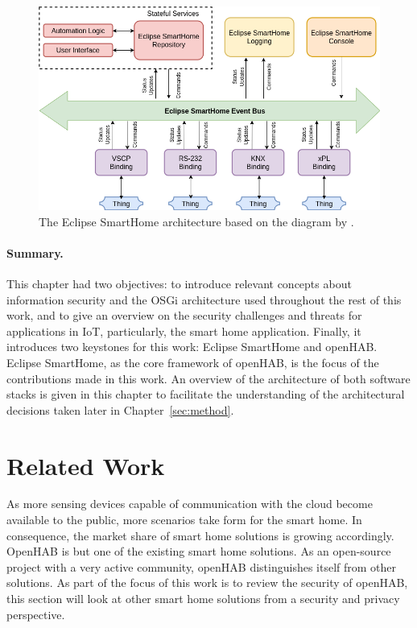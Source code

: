 \documentclass[12pt]{article}
\begin{document}
\begin{figure} [ht] 
\begin{center}
\includegraphics[width=\textwidth]{esh_architecture}
\caption{The Eclipse SmartHome architecture based on the diagram by \citet{esh_02}.}
\label{fig:esh_architecture}
\end{center}
\end{figure}

\paragraph{Summary.} This chapter had two objectives: to introduce relevant concepts about information security and the OSGi architecture used throughout the rest of this work, and to give an overview on the security challenges and threats for applications in IoT, particularly, the smart home application. Finally, it introduces two keystones for this work: Eclipse SmartHome and openHAB. Eclipse SmartHome, as the core framework of openHAB, is the focus of the contributions made in this work. An overview of the architecture of both software stacks is given in this chapter to facilitate the understanding of the architectural decisions taken later in Chapter~\ref{sec:method}.

\clearpage
\section{Related Work}
\label{sec:related}
As more sensing devices capable of communication with the cloud become available to the public, more scenarios take form for the smart home. In consequence, the market share of smart home solutions is growing accordingly. OpenHAB is but one of the existing smart home solutions. As an open-source project with a very active community, openHAB distinguishes itself from other solutions. As part of the focus of this work is to review the security of openHAB, this section will look at other smart home solutions from a security and privacy perspective. 
\end{document}
